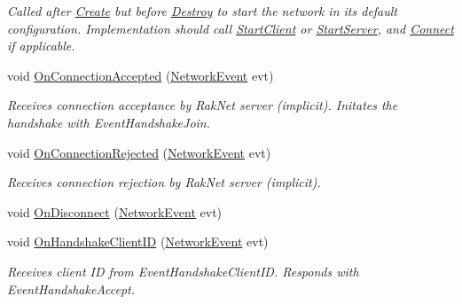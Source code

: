 \begin{DoxyCompactItemize}
\begin{DoxyCompactList}\small\item\em Called after \hyperlink{class_skyrates_1_1_common_1_1_network_1_1_network_common_a575172eb9f965e181e19649bcce38ca0}{Create} but before \hyperlink{class_skyrates_1_1_common_1_1_network_1_1_network_common_aa00266a16aa27dfd0eb242c74856a92a}{Destroy} to start the network in its default configuration. Implementation should call \hyperlink{class_skyrates_1_1_common_1_1_network_1_1_network_common_a982b732d621ff3f8738319053af8d154}{Start\-Client} or \hyperlink{class_skyrates_1_1_common_1_1_network_1_1_network_common_ac1209cf3fc31d2f145678971472ec20c}{Start\-Server}, and \hyperlink{class_skyrates_1_1_common_1_1_network_1_1_network_common_aa11961a4a6dc22c782552eb96e27c6e1}{Connect} if applicable.  \end{DoxyCompactList}\item 
void \hyperlink{class_skyrates_1_1_client_1_1_network_1_1_client_a8e264c8e627eace760e2a110b2b39a69}{On\-Connection\-Accepted} (\hyperlink{class_skyrates_1_1_common_1_1_network_1_1_event_1_1_network_event}{Network\-Event} evt)
\begin{DoxyCompactList}\small\item\em Receives connection acceptance by Rak\-Net server (implicit). Initates the handshake with Event\-Handshake\-Join. \end{DoxyCompactList}\item 
void \hyperlink{class_skyrates_1_1_client_1_1_network_1_1_client_ac010eecabdf4397ad93d9cae5ea60445}{On\-Connection\-Rejected} (\hyperlink{class_skyrates_1_1_common_1_1_network_1_1_event_1_1_network_event}{Network\-Event} evt)
\begin{DoxyCompactList}\small\item\em Receives connection rejection by Rak\-Net server (implicit). \end{DoxyCompactList}\item 
void \hyperlink{class_skyrates_1_1_client_1_1_network_1_1_client_a55896d8aa53f613e8b12aa20f5ae8480}{On\-Disconnect} (\hyperlink{class_skyrates_1_1_common_1_1_network_1_1_event_1_1_network_event}{Network\-Event} evt)
\item 
void \hyperlink{class_skyrates_1_1_client_1_1_network_1_1_client_a8ef146c33d3ed104d0f937896964d4b2}{On\-Handshake\-Client\-I\-D} (\hyperlink{class_skyrates_1_1_common_1_1_network_1_1_event_1_1_network_event}{Network\-Event} evt)
\begin{DoxyCompactList}\small\item\em Receives client I\-D from Event\-Handshake\-Client\-I\-D. Responds with Event\-Handshake\-Accept. \end{DoxyCompactList}\item 

\end{DoxyCompactItemize}
